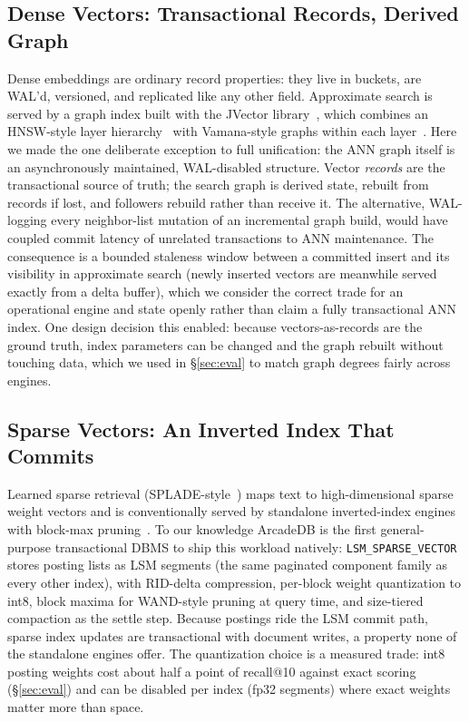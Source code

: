 \documentclass[conference]{IEEEtran}
\newcommand{\arcadedb}{ArcadeDB}
\begin{document}
\subsection{Dense Vectors: Transactional Records, Derived Graph}

Dense embeddings are ordinary record properties: they live in buckets, are
WAL'd, versioned, and replicated like any other field. Approximate search is
served by a graph index built with the JVector
library~\cite{jvector2024repo}, which combines an HNSW-style layer
hierarchy~\cite{malkov2020hnsw} with Vamana-style graphs within each
layer~\cite{subramanya2019diskann}. Here we made the one deliberate exception
to full unification: the ANN graph itself is an asynchronously maintained,
WAL-disabled structure. Vector \emph{records} are the transactional source of
truth; the search graph is derived state, rebuilt from records if lost, and
followers rebuild rather than receive it. The alternative, WAL-logging every
neighbor-list mutation of an incremental graph build, would have coupled
commit latency of unrelated transactions to ANN maintenance. The consequence
is a bounded staleness window between a committed insert and its
visibility in approximate search (newly inserted vectors are meanwhile served
exactly from a delta buffer), which we consider the correct trade for an
operational engine and state openly rather than claim a fully transactional
ANN index. One design decision this enabled: because vectors-as-records are
the ground truth, index parameters can be changed and the graph rebuilt
without touching data, which we used in \S\ref{sec:eval} to match graph
degrees fairly across engines.

\subsection{Sparse Vectors: An Inverted Index That Commits}

Learned sparse retrieval (SPLADE-style~\cite{formal2021splade}) maps text to
high-dimensional sparse weight vectors and is conventionally served by
standalone inverted-index engines with block-max
pruning~\cite{broder2003wand,ding2011blockmax,tonellotto2018efficient}. To our
knowledge \arcadedb{} is the first general-purpose transactional DBMS to ship
this workload natively: \texttt{LSM\_SPARSE\_VECTOR} stores posting lists as
LSM segments (the same paginated component family as every other index), with
RID-delta compression, per-block weight quantization to int8, block maxima
for WAND-style pruning at query time, and size-tiered compaction as the
settle step. Because postings ride the LSM commit path, sparse index updates
are transactional with document writes, a property none of the standalone
engines offer. The quantization choice is a measured trade: int8 posting
weights cost about half a point of recall@10 against exact scoring
(\S\ref{sec:eval}) and can be disabled per index (fp32 segments) where exact
weights matter more than space.
\end{document}
